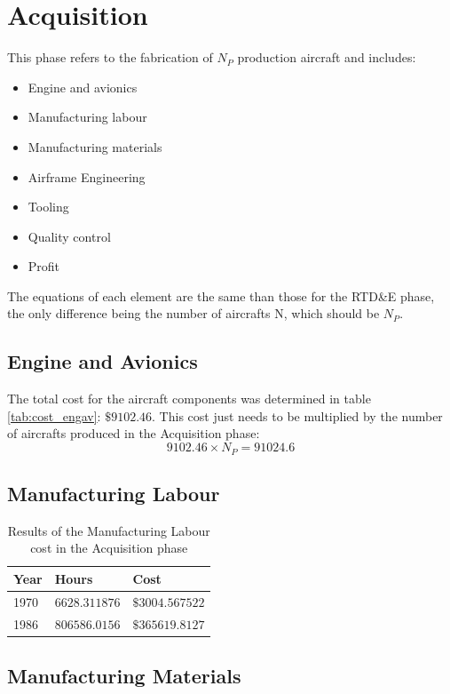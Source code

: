 \documentclass[english,fira]{ist-report}
\begin{document}
{%
\section{Acquisition}
This phase refers to the fabrication of $N_P$ production aircraft and includes:
\begin{itemize}
    \item Engine and avionics
    \item Manufacturing labour
    \item Manufacturing materials
    \item Airframe Engineering
    \item Tooling
    \item Quality control
    \item Profit
\end{itemize}
The equations of each element are the same than those for the RTD\&E phase, the only difference being the number of aircrafts N, which should be $N_P$. 
\subsection{Engine and Avionics}
The total cost for the aircraft components was determined in table \ref{tab:cost_engav}: $\$9102.46$. This cost just needs to be multiplied by the number of aircrafts produced in the Acquisition phase:
\begin{equation*}
    9102.46\times N_P=91024.6
\end{equation*}

\subsection{Manufacturing Labour}

\begin{table}[ht] 
    \centering
    \begin{tabular}{l|ll}\toprule
        Year & Hours & Cost   \\
        \midrule
        1970 & $6628.311876$ & $\$3004.567522$ \\
        1986 & $806586.0156$ & $\$365619.8127$ \\
        \bottomrule
    \end{tabular} 
    \caption{Results of the Manufacturing Labour cost in the Acquisition phase}
    \label{tab:res_manlab_acq}
\end{table}

\subsection{Manufacturing Materials}

}
\end{document}
